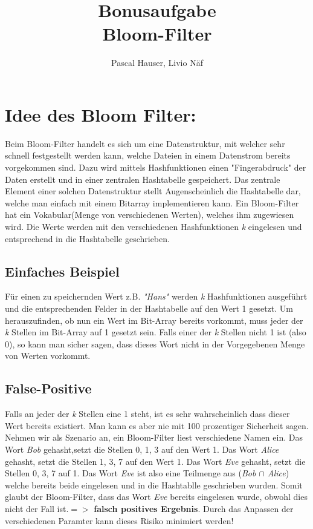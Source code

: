\documentclass[16 pt]{article}
\author{Pascal Hauser, Livio Näf}
\title{%
\textbf{\Huge Bonusaufgabe} \\
  \Large Bloom-Filter \\
}
\begin{document}
\maketitle
\newpage
\section{Idee des Bloom Filter: }
Beim Bloom-Filter handelt es sich um eine Datenstruktur, mit welcher sehr schnell festgestellt werden kann, welche Dateien in einem Datenstrom bereits vorgekommen sind. Dazu wird mittels Hashfunktionen einen "Fingerabdruck" der Daten erstellt und in einer zentralen Hashtabelle gespeichert. 
Das zentrale Element einer solchen Datenstruktur stellt Augenscheinlich die Hashtabelle dar, welche man einfach mit einem Bitarray implementieren kann.
Ein Bloom-Filter hat ein Vokabular(Menge von verschiedenen Werten), welches ihm zugewiesen wird. Die Werte werden mit den verschiedenen Hashfunktionen \emph{k} eingelesen und entsprechend in die Hashtabelle geschrieben.
\subsection{Einfaches Beispiel}
Für einen zu speichernden Wert z.B. \emph{"Hans"} werden \emph{k} Hashfunktionen ausgeführt und die entsprechenden Felder in der Hashtabelle auf den Wert 1 gesetzt.
Um herauszufinden, ob nun ein Wert im Bit-Array bereits vorkommt, muss jeder der \emph{k} Stellen im Bit-Array auf 1 gesetzt sein. Falls einer der \emph{k} Stellen nicht 1 ist (also 0), so kann man sicher sagen, dass dieses Wort nicht in der Vorgegebenen Menge von Werten vorkommt.
\subsection{False-Positive}
Falls an jeder der \emph{k} Stellen eine 1 steht, ist es sehr wahrscheinlich dass dieser Wert bereits existiert. Man kann es aber nie mit 100 prozentiger Sicherheit sagen.
Nehmen wir als Szenario an, ein Bloom-Filter liest verschiedene Namen ein. Das Wort \emph{Bob} gehasht,setzt die Stellen 0, 1, 3 auf den Wert 1. Das Wort \emph{Alice} gehasht, setzt die Stellen 1, 3, 7 auf den Wert 1. Das Wort \emph{Eve} gehasht, setzt die Stellen 0, 3, 7 auf 1. Das Wort \emph{Eve} ist also eine Teilmenge aus (\emph{Bob $\cap$ Alice}) welche bereits beide eingelesen und in die Hashtablle geschrieben wurden. Somit glaubt der Bloom-Filter, dass das Wort \emph{Eve} bereits eingelesen wurde, obwohl dies nicht der Fall ist.$=>$  \textbf{falsch positives Ergebnis}.
Durch das Anpassen der verschiedenen Paramter kann dieses Risiko minimiert werden!
\end{document}
